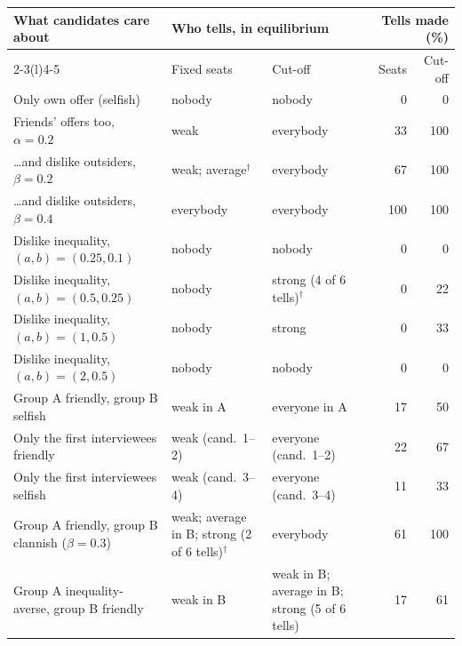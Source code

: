 \begin{tabular}{@{}lllrr@{}}
\toprule
What candidates care about & \multicolumn{2}{l}{Who tells, in equilibrium} & \multicolumn{2}{r}{Tells made (\%)} \\
\cmidrule(lr){2-3}\cmidrule(l){4-5}
 & Fixed seats & Cut-off & Seats & Cut-off \\
\midrule
Only own offer (selfish) & nobody & nobody & 0 & 0 \\
Friends' offers too, $\alpha{=}0.2$ & weak & everybody & 33 & 100 \\
\ldots and dislike outsiders, $\beta{=}0.2$ & weak; average$^\dagger$ & everybody & 67 & 100 \\
\ldots and dislike outsiders, $\beta{=}0.4$ & everybody & everybody & 100 & 100 \\
Dislike inequality, $(a,b){=}(0.25,0.1)$ & nobody & nobody & 0 & 0 \\
Dislike inequality, $(a,b){=}(0.5,0.25)$ & nobody & strong (4 of 6 tells)$^\dagger$ & 0 & 22 \\
Dislike inequality, $(a,b){=}(1,0.5)$ & nobody & strong & 0 & 33 \\
Dislike inequality, $(a,b){=}(2,0.5)$ & nobody & nobody & 0 & 0 \\
\midrule
Group A friendly, group B selfish & weak in A & everyone in A & 17 & 50 \\
Only the first interviewees friendly & weak (cand.\ 1--2) & everyone (cand.\ 1--2) & 22 & 67 \\
Only the first interviewees selfish & weak (cand.\ 3--4) & everyone (cand.\ 3--4) & 11 & 33 \\
Group A friendly, group B clannish ($\beta{=}0.3$) & weak; average in B; strong (2 of 6 tells)$^\dagger$ & everybody & 61 & 100 \\
Group A inequality-averse, group B friendly & weak in B & weak in B; average in B; strong (5 of 6 tells) & 17 & 61 \\
\bottomrule
\end{tabular}
